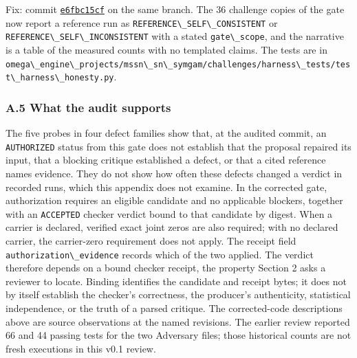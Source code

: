 \documentclass[
  11pt,
]{article}
\newcommand{\passthrough}[1]{#1}
\begin{document}
Fix: commit
\href{https://github.com/dbccpage/the_symbol_game/commit/e6fbc15cf011121597a82a1d199626063bedf7c0}{\passthrough{\lstinline!e6fbc15cf!}}
on the same branch. The 36 challenge copies of the gate now report a
reference run as \passthrough{\lstinline!REFERENCE\_SELF\_CONSISTENT!}
or \passthrough{\lstinline!REFERENCE\_SELF\_INCONSISTENT!} with a stated
\passthrough{\lstinline!gate\_scope!}, and the narrative is a table of
the measured counts with no templated claims. The tests are in
\passthrough{\lstinline!omega\_engine\_projects/mssn\_sn\_symgam/challenges/harness\_tests/test\_harness\_honesty.py!}.

\hypertarget{a.5-what-the-audit-supports}{%
\subsubsection{A.5 What the audit
supports}\label{a.5-what-the-audit-supports}}

The five probes in four defect families show that, at the audited
commit, an \passthrough{\lstinline!AUTHORIZED!} status from this gate
does not establish that the proposal repaired its input, that a blocking
critique established a defect, or that a cited reference names evidence.
They do not show how often these defects changed a verdict in recorded
runs, which this appendix does not examine. In the corrected gate,
authorization requires an eligible candidate and no applicable blockers,
together with an \passthrough{\lstinline!ACCEPTED!} checker verdict
bound to that candidate by digest. When a carrier is declared, verified
exact joint zeros are also required; with no declared carrier, the
carrier-zero requirement does not apply. The receipt field
\passthrough{\lstinline!authorization\_evidence!} records which of the
two applied. The verdict therefore depends on a bound checker receipt,
the property Section 2 asks a reviewer to locate. Binding identifies the
candidate and receipt bytes; it does not by itself establish the
checker's correctness, the producer's authenticity, statistical
independence, or the truth of a parsed critique. The corrected-code
descriptions above are source observations at the named revisions. The
earlier review reported 66 and 44 passing tests for the two Adversary
files; those historical counts are not fresh executions in this v0.1
review.
\end{document}
